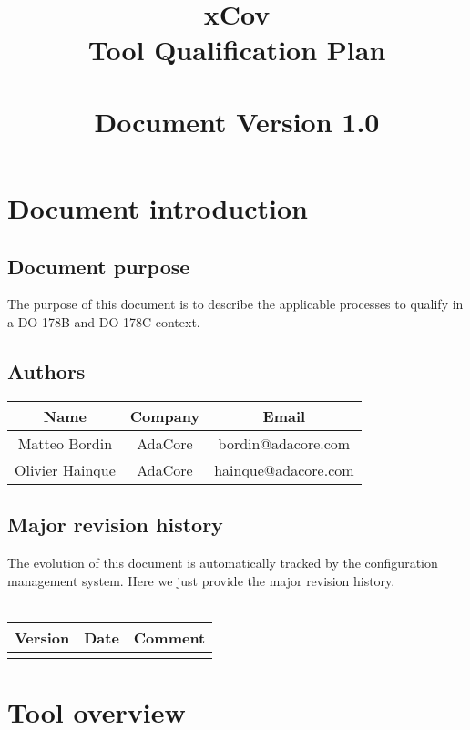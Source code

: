 \documentclass {report}
\begin{document}
\title{\huge xCov\\Tool Qualification Plan\\ \ \\ \large \textbf{Document Version 1.0}}

\maketitle
\tableofcontents

\chapter{Document introduction}

\section{Document purpose}
The purpose of this document is to describe the applicable processes to qualify \xcov in a DO-178B and DO-178C context.

\section{Authors}
\begin{tabular}{|c|c|c|}
\hline
\textbf{Name} & \textbf{Company} & \textbf{Email} \\ \hline
Matteo Bordin & AdaCore & bordin@adacore.com \\ \hline
Olivier Hainque & AdaCore & hainque@adacore.com \\ \hline
\end{tabular}

\section{Major revision history}
The evolution of this document is automatically tracked by the configuration management system. Here we just provide the major revision history.
\ \\ \\
\begin{tabular}{|c|c|c|}
\hline
\textbf{Version} & \textbf{Date} & \textbf{Comment} \\ \hline
 &  &  \\ \hline
\end{tabular}



\chapter{Tool overview}
\end{document}
